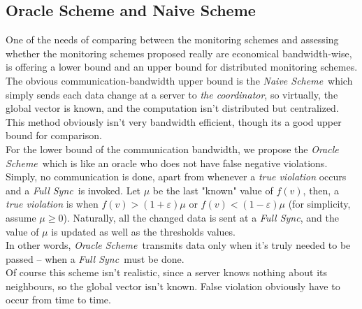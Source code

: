 \documentclass[10pt, conference]{IEEEtran}
\newcommand{\fullSync}{\textit{Full Sync}}
\newcommand{\naiveScheme}{\textit{Naive Scheme}}
\newcommand{\oracleScheme}{\textit{Oracle Scheme}}
\newcommand{\theCoordinator}{\textit{the coordinator}}
\begin{document}
\subsection{Oracle Scheme and Naive Scheme}
One of the needs of comparing between the monitoring schemes and assessing whether the monitoring schemes proposed really are economical bandwidth-wise, is offering a lower bound and an upper bound for distributed monitoring schemes. \\
The obvious communication-bandwidth upper bound is the \naiveScheme \ which simply sends each data change at a server to \theCoordinator , so virtually, the global vector is known, and the computation isn't distributed but centralized. This method obviously isn't very bandwidth efficient, though its a good upper bound for comparison. \\
For the lower bound of the communication bandwidth, we propose the \oracleScheme \ which is like an oracle who does not have false negative violations. Simply, no communication is done, apart from whenever a \textit{true violation} occurs and a \fullSync \ is invoked. Let $\mu$ be the last "known" value of $f(v)$, then, a \textit{true violation} is when ${f(v) > (1
+\varepsilon)\mu}$ or ${f(v) < (1-\varepsilon)\mu}$ (for simplicity, assume ${\mu \geq 0}$). Naturally, all the changed data  is sent at a \fullSync , and the value of $\mu$ is updated as well as the thresholds values. \\
In other words, \oracleScheme \ transmits data only when it's truly needed to be passed -- when a \fullSync \ must be done. \\
Of course this scheme isn't realistic, since a server knows nothing about its neighbours, so the global vector isn't known. False violation obviously have to occur from time to time. 
\end{document}
